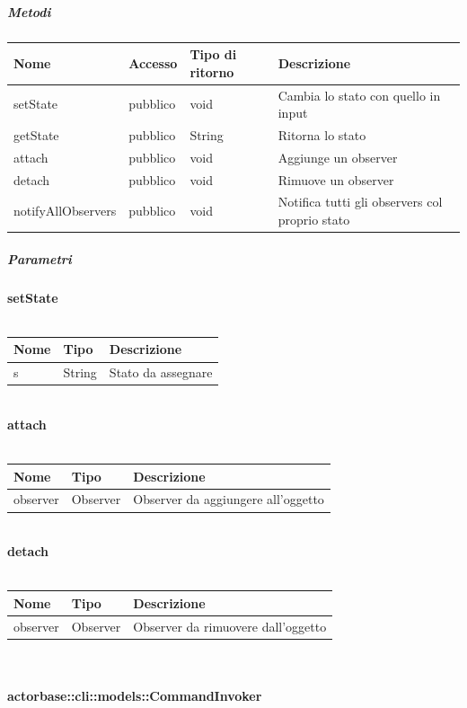 \documentclass{scalatekids-article}
\begin{document}
\subparagraph{Metodi}

\begin{tabular}{| p{3cm} | p{1.5cm} | p{3.5cm} | p{9cm} |}
  \hline
  Nome & Accesso & Tipo di ritorno & Descrizione\\
  \hline
  setState & pubblico & void & Cambia lo stato con quello in input\\
  \hline
  getState & pubblico & String & Ritorna lo stato\\
  \hline
  attach & pubblico & void & Aggiunge un observer\\
  \hline
  detach & pubblico & void & Rimuove un observer\\
  \hline
  notifyAllObservers & pubblico & void & Notifica tutti gli observers col proprio stato\\
  \hline
\end{tabular}

\subparagraph{Parametri}

\textbf{setState}\\ \\
\begin{tabular}{| p{3cm} | p{3.5cm} | p{8.5cm} |}
  \hline
  Nome & Tipo & Descrizione\\
  \hline
  s & String & Stato da assegnare\\
  \hline
\end{tabular}\\

\textbf{attach}\\ \\
\begin{tabular}{| p{3cm} | p{3.5cm} | p{8.5cm} |}
  \hline
  Nome & Tipo & Descrizione\\
  \hline
  observer & Observer & Observer da aggiungere all'oggetto\\
  \hline
\end{tabular}\\

\textbf{detach}\\ \\
\begin{tabular}{| p{3cm} | p{3.5cm} | p{8.5cm} |}
  \hline
  Nome & Tipo & Descrizione\\
  \hline
  observer & Observer & Observer da rimuovere dall'oggetto\\
  \hline
\end{tabular}\\

\paragraph{actorbase::cli::models::CommandInvoker}
\label{sec:actorbase::cli::models::CommandInvoker}
\end{document}
